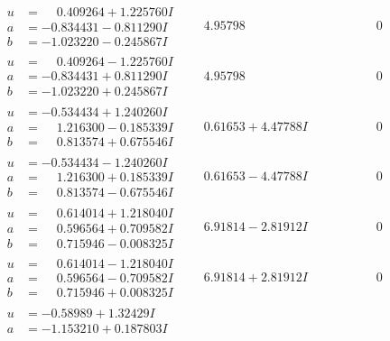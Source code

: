 \documentclass[1p]{elsarticle_modified}
\theoremstyle{definition}
\begin{document}
$$\begin{array}{c|c|c}
\begin{aligned}
u &= \phantom{-}0.409264 + 1.225760 I \\
a &= -0.834431 - 0.811290 I \\
b &= -1.023220 - 0.245867 I\end{aligned}
 & \phantom{-}4.95798\phantom{ +0.000000I} & \phantom{-0.000000 } 0 \\ \hline\begin{aligned}
u &= \phantom{-}0.409264 - 1.225760 I \\
a &= -0.834431 + 0.811290 I \\
b &= -1.023220 + 0.245867 I\end{aligned}
 & \phantom{-}4.95798\phantom{ +0.000000I} & \phantom{-0.000000 } 0 \\ \hline\begin{aligned}
u &= -0.534434 + 1.240260 I \\
a &= \phantom{-}1.216300 - 0.185339 I \\
b &= \phantom{-}0.813574 + 0.675546 I\end{aligned}
 & \phantom{-}0.61653 + 4.47788 I & \phantom{-0.000000 } 0 \\ \hline\begin{aligned}
u &= -0.534434 - 1.240260 I \\
a &= \phantom{-}1.216300 + 0.185339 I \\
b &= \phantom{-}0.813574 - 0.675546 I\end{aligned}
 & \phantom{-}0.61653 - 4.47788 I & \phantom{-0.000000 } 0 \\ \hline\begin{aligned}
u &= \phantom{-}0.614014 + 1.218040 I \\
a &= \phantom{-}0.596564 + 0.709582 I \\
b &= \phantom{-}0.715946 - 0.008325 I\end{aligned}
 & \phantom{-}6.91814 - 2.81912 I & \phantom{-0.000000 } 0 \\ \hline\begin{aligned}
u &= \phantom{-}0.614014 - 1.218040 I \\
a &= \phantom{-}0.596564 - 0.709582 I \\
b &= \phantom{-}0.715946 + 0.008325 I\end{aligned}
 & \phantom{-}6.91814 + 2.81912 I & \phantom{-0.000000 } 0 \\ \hline\begin{aligned}
u &= -0.58989 + 1.32429 I \\
a &= -1.153210 + 0.187803 I \\

\end{aligned}
\end{array}$$
\end{document}
